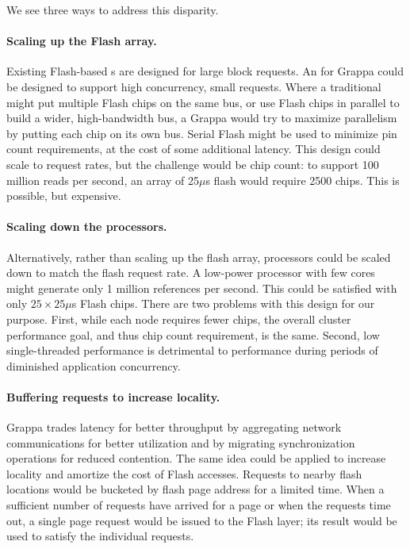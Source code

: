 We see three ways to address this disparity.

\paragraph{Scaling up the Flash array.}
Existing Flash-based \hspace{0.75pt}s are designed for large block requests. An
 for Grappa could be designed to support high concurrency, small
requests. Where a traditional  might put multiple Flash chips on
the same bus, or use Flash chips in parallel to build a wider,
high-bandwidth bus, a Grappa  would try to maximize parallelism by
putting each chip on its own bus. Serial Flash might be used to
minimize pin count requirements, at the cost of some additional
latency. This design could scale to request rates, but the challenge
would be chip count: to support 100 million reads per second, an array of
25$\mu$s flash would require 2500 chips. This is possible, but expensive.

\paragraph{Scaling down the processors.}
Alternatively, rather than scaling up the flash array, processors
could be scaled down to match the flash request rate. A low-power
processor with few cores might generate only 1 million references per
second. This could be satisfied with only $25\times 25\mu$s Flash chips. 
There are two problems with this design for our purpose. First, while each node
requires fewer chips, the overall cluster performance goal, and thus
chip count requirement, is the same. Second, low single-threaded performance is detrimental to performance during periods of diminished application concurrency.

\paragraph{Buffering requests to increase locality.}
Grappa trades latency for better throughput by aggregating network
communications for better utilization and by migrating synchronization
operations for reduced contention. The same idea could be applied to
increase locality and amortize the cost of Flash accesses. Requests
to nearby flash locations would be bucketed by flash page address for a
limited time. When a sufficient number of requests have arrived for a page
or when the requests time out, a single page request would be issued to the Flash
layer; its result would be used to satisfy the individual requests.

